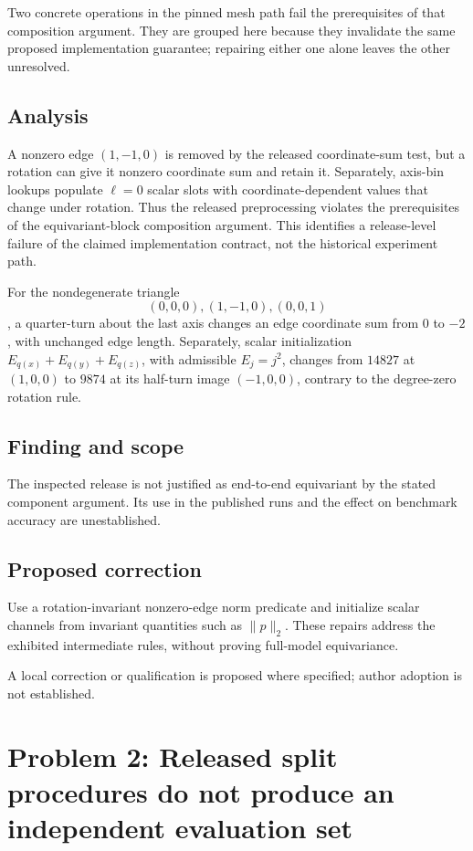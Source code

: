 \documentclass[11pt]{article}
\begin{document}
Two concrete operations in the pinned mesh path fail the prerequisites of that composition argument. They are grouped here because they invalidate the same proposed implementation guarantee; repairing either one alone leaves the other unresolved.

\subsection*{Analysis}

A nonzero edge \((1,-1,0)\) is removed by the released coordinate-sum test, but a rotation can give it nonzero coordinate sum and retain it. Separately, axis-bin lookups populate \(\ell=0\) scalar slots with coordinate-dependent values that change under rotation. Thus the released preprocessing violates the prerequisites of the equivariant-block composition argument. This identifies a release-level failure of the claimed implementation contract, not the historical experiment path.

For the nondegenerate triangle \[(0,0,0),(1,-1,0),(0,0,1)\], a quarter-turn about the last axis changes an edge coordinate sum from \(0\) to \(-2\), with unchanged edge length. Separately, scalar initialization \(E_{q(x)}+E_{q(y)}+E_{q(z)}\), with admissible \(E_j=j^2\), changes from \(14827\) at \((1,0,0)\) to \(9874\) at its half-turn image \((-1,0,0)\), contrary to the degree-zero rotation rule.

\subsection*{Finding and scope}

The inspected release is not justified as end-to-end equivariant by the stated component argument. Its use in the published runs and the effect on benchmark accuracy are unestablished.

\subsection*{Proposed correction}

Use a rotation-invariant nonzero-edge norm predicate and initialize scalar channels from invariant quantities such as \(\|p\|_2\). These repairs address the exhibited intermediate rules, without proving full-model equivariance.

A local correction or qualification is proposed where specified; author adoption is not established.

\section*{Problem 2: Released split procedures do not produce an independent evaluation set}
\end{document}
